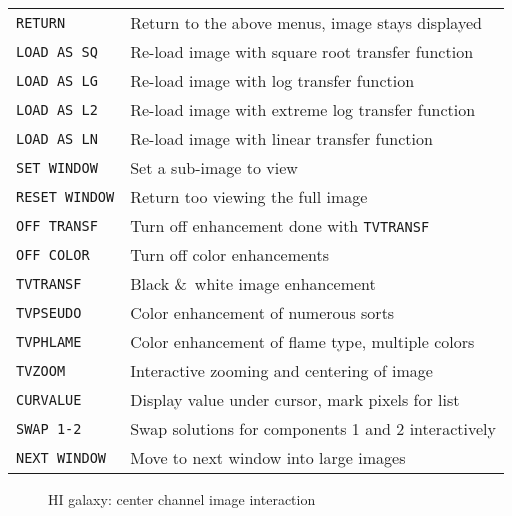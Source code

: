 \documentclass[twoside]{article}
\newcommand{\Hi}[1]{\textcolor{hicol}{#1}}
\newcommand{\putfig}[1]{\texttt{[image: \#1.eps]}}
\begin{document}
\vfill\eject
\begin{center}
\begin{tabular}{|l|l|}\hline
 {\tt RETURN     } & Return to the above menus, image stays displayed\\
 {\tt LOAD AS SQ } & Re-load image with square root transfer function\\
 {\tt LOAD AS LG } & Re-load image with log transfer function\\
 {\tt LOAD AS L2 } & Re-load image with extreme log transfer function\\
 {\tt LOAD AS LN } & Re-load image with linear transfer function\\
\Hi{{\tt SET WINDOW}} & \Hi{Set a sub-image to view}\\
\Hi{{\tt RESET WINDOW}} & \Hi{Return too viewing the full image}\\
 {\tt OFF TRANSF } & Turn off enhancement done with {\tt TVTRANSF}\\
 {\tt OFF COLOR  } & Turn off color enhancements\\
 {\tt TVTRANSF   } & Black \&\ white image enhancement\\
 {\tt TVPSEUDO   } & Color enhancement of numerous sorts\\
 {\tt TVPHLAME   } & Color enhancement of flame type, multiple colors\\
 {\tt TVZOOM     } & Interactive zooming and centering of image\\
 {\tt CURVALUE   } & Display value under cursor, mark pixels for list\\
 {\tt SWAP 1-2   } & Swap solutions for components 1 and 2 interactively\\
 {\tt NEXT WINDOW} & Move to next window into large images\\ \hline
\end{tabular}
\end{center}

\begin{figure}
\begin{center}
\resizebox{6.0in}{!}{\putfig{XGAUS.HIcent}}
\caption{HI galaxy: center channel image interaction}
\label{fig:XGAUS.HIcent}
\end{center}
\end{figure}

\end{document}
